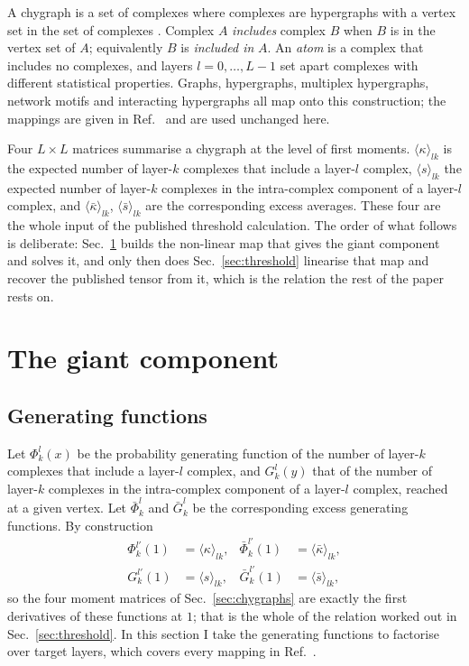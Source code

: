 \documentclass[aps,pre,twocolumn,superscriptaddress,floatfix,longbibliography]{revtex4-2}
\newcommand{\ave}[1]{\langle #1 \rangle}
\begin{document}
A chygraph is a set of complexes where complexes are hypergraphs with a vertex
set in the set of complexes \cite{vazquez2023pre}. Complex $A$ \emph{includes}
complex $B$ when $B$ is in the vertex set of $A$; equivalently $B$ is
\emph{included in} $A$. An \emph{atom} is a complex that includes no complexes,
and layers $l=0,\dots,L-1$ set apart complexes with different statistical
properties. Graphs, hypergraphs, multiplex hypergraphs, network motifs and
interacting hypergraphs all map onto this construction; the mappings are given
in Ref.~\cite{vazquez2024comnet} and are used unchanged here.

Four $L\times L$ matrices summarise a chygraph at the level of first moments.
$\ave{\kappa}_{lk}$ is the expected number of layer-$k$ complexes that include a
layer-$l$ complex, $\ave{s}_{lk}$ the expected number of layer-$k$ complexes in
the intra-complex component of a layer-$l$ complex, and
$\ave{\bar\kappa}_{lk}$, $\ave{\bar s}_{lk}$ are the corresponding excess
averages. These four are the whole input of the published threshold calculation.
The order of what follows is deliberate: Sec.~\ref{sec:map} builds the
non-linear map that gives the giant component and solves it, and only then does
Sec.~\ref{sec:threshold} linearise that map and recover the published tensor
from it, which is the relation the rest of the paper rests on.

\section{The giant component}\label{sec:map}

\subsection{Generating functions}

Let $\Phi^l_k(x)$ be the probability generating function of the number of
layer-$k$ complexes that include a layer-$l$ complex, and $G^l_k(y)$ that of the
number of layer-$k$ complexes in the intra-complex component of a layer-$l$
complex, reached at a given vertex. Let $\bar\Phi^l_k$ and $\bar G^l_k$ be the
corresponding excess generating functions. By construction
\begin{align}
  \Phi^{l\prime}_k(1)&=\ave{\kappa}_{lk}, &
  \bar\Phi^{l\prime}_k(1)&=\ave{\bar\kappa}_{lk},\nonumber\\
  G^{l\prime}_k(1)&=\ave{s}_{lk}, &
  \bar G^{l\prime}_k(1)&=\ave{\bar s}_{lk},
  \label{eq:firstderiv}
\end{align}
so the four moment matrices of Sec.~\ref{sec:chygraphs} are exactly the first
derivatives of these functions at $1$; that is the whole of the relation worked
out in Sec.~\ref{sec:threshold}. In this section I take the generating functions to factorise over target
layers, which covers every mapping in Ref.~\cite{vazquez2024comnet}.
\end{document}
